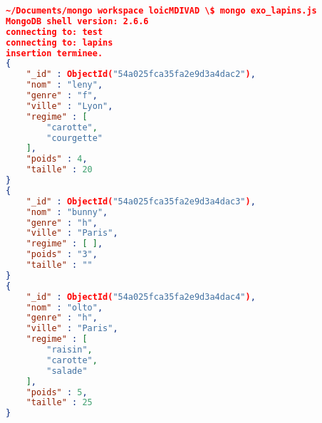 \begin{lstlisting}[language=JSON, caption= lapin.france]
~/Documents/mongo workspace loicMDIVAD \$ mongo exo_lapins.js 
MongoDB shell version: 2.6.6
connecting to: test
connecting to: lapins
insertion terminee.
{
	"_id" : ObjectId("54a025fca35fa2e9d3a4dac2"),
	"nom" : "leny",
	"genre" : "f",
	"ville" : "Lyon",
	"regime" : [
		"carotte",
		"courgette"
	],
	"poids" : 4,
	"taille" : 20
}
{
	"_id" : ObjectId("54a025fca35fa2e9d3a4dac3"),
	"nom" : "bunny",
	"genre" : "h",
	"ville" : "Paris",
	"regime" : [ ],
	"poids" : "3",
	"taille" : ""
}
{
	"_id" : ObjectId("54a025fca35fa2e9d3a4dac4"),
	"nom" : "olto",
	"genre" : "h",
	"ville" : "Paris",
	"regime" : [
		"raisin",
		"carotte",
		"salade"
	],
	"poids" : 5,
	"taille" : 25
}


\end{lstlisting}

